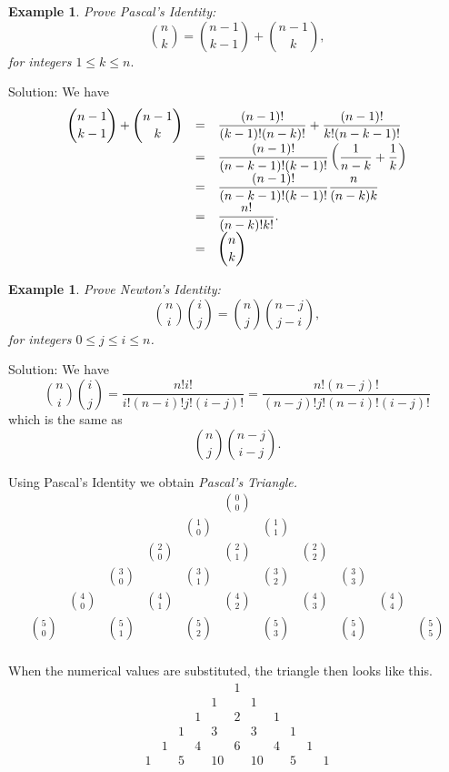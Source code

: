 \documentclass[11pt, openany]{book}
\theoremstyle{change} \theoremheaderfont{\blue\sffamily\bfseries}
\newtheorem{exa}[thm]{Example}
\theoremstyle{nonumberplain} \theoremheaderfont{\sffamily\bfseries}
\def\binom#1#2{{#1\choose#2}}
\newcommand{\í}{\'{\i}}
\begin{document}
\begin{exa} Prove {\em Pascal's Identity}:
$$ \binom{n}{k} = \binom{n - 1}{k - 1} + \binom{n - 1}{k},$$for
integers $1 \leq k \leq n.$ \end{exa} Solution: We have $$
{\everymath{\displaystyle}\begin{array}{lcl}\binom{n - 1}{k - 1} +
\binom{n - 1}{k} & = &
\frac{(n - 1)!}{(k - 1)!(n - k)!} + \frac{(n - 1)!}{k!(n - k - 1)!} \\
& = & \frac{(n - 1)!}{(n - k - 1)!(k - 1)!}\left( \frac{1}{n - k} + \frac{1}{k}\right) \\
& = & \frac{(n - 1)!}{(n - k - 1)!(k - 1)!}\frac{n}{(n - k)k} \\
& = & \frac{n!}{(n - k)!k!} .\\
& = & \binom{n}{k}\end{array}}$$
\begin{exa} Prove {\em Newton's Identity}:
$$ \binom{n}{i}\binom{i}{j} = \binom{n}{j}\binom{n - j}{j - i},$$ for integers
$0 \leq j \leq i \leq n$.\end{exa} Solution: We have
$$ \binom{n}{i}\binom{i}{j} = \frac{n!i!}{i!(n - i)!j!(i - j)!} = \frac{n!(n - j)!}{(n - j)!j!(n - i)!(i - j)!} $$
which is the same as$$ \binom{n}{j}\binom{n - j}{i - j}.$$



 Using Pascal's Identity we obtain
{\em Pascal's Triangle.} \renewcommand{\arraystretch}{1.2}
$$\begin{array}{ccccccccccc}
 & & & & & \binom{0}{0} & & & & & \\
 & & & &  \binom{1}{0} & &  \binom{1}{1} & & & &  \\
 & & &  \binom{2}{0} & &  \binom{2}{1} & &  \binom{2}{2} & & &  \\
 & &  \binom{3}{0} & &  \binom{3}{1} & &  \binom{3}{2} & &  \binom{3}{3} & & \\
 &  \binom{4}{0} & &  \binom{4}{1} & &  \binom{4}{2} & &  \binom{4}{3} & &  \binom{4}{4} &  \\
  \binom{5}{0} & &  \binom{5}{1} & &  \binom{5}{2} & &  \binom{5}{3} & &  \binom{5}{4} & &  \binom{5}{5}  \\
\end{array}$$




When the numerical values are substituted, the triangle then looks
like this.
$$
\begin{array}{ccccccccccc}
 & & & & & 1 & & & & &  \\
 & & & & 1 & & 1 & & & &  \\
 & & & 1 & & 2 & & 1 & & & \\
 & & 1 & & 3 & & 3 & & 1 & &  \\
 & 1 & & 4 & & 6 & & 4 & & 1 &  \\
 1 & & 5 & & 10 & & 10 & & 5 & & 1  \\
\end{array}$$
\end{document}
